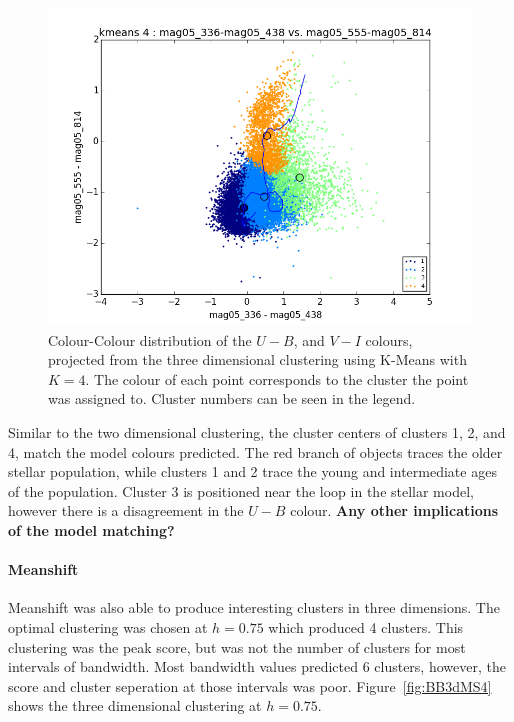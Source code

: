 \begin{figure}[H]
\centering
\includegraphics[width=\linewidth]{figs/broad/kmeans_base_color_4cl_mag05_336-mag05_438vsmag05_555-mag05_814}
\caption{Colour-Colour distribution of the $U - B$, and $V - I$ colours, projected from the three dimensional clustering using K-Means with $K=4$. The colour of each point corresponds to the cluster the point was assigned to. Cluster numbers can be seen in the legend.}
\label{fig:BB3dKM4base}
\end{figure}

Similar to the two dimensional clustering, the cluster centers of clusters 1, 2, and 4, match the model colours predicted.
The red branch of objects traces the older stellar population, while clusters 1 and 2 trace the young and intermediate ages of the population.
Cluster 3 is positioned near the loop in the stellar model, however there is a disagreement in the $U - B$ colour.
\textbf{Any other implications of the model matching?}

\paragraph{Meanshift}

Meanshift was also able to produce interesting clusters in three dimensions. 
The optimal clustering was chosen at $h=0.75$ which produced 4 clusters.
This clustering was the peak score, but was not the number of clusters for most intervals of bandwidth.
Most bandwidth values predicted 6 clusters, however, the score and cluster seperation at those intervals was poor.
Figure~\ref{fig:BB3dMS4} shows the three dimensional clustering at $h=0.75$.

